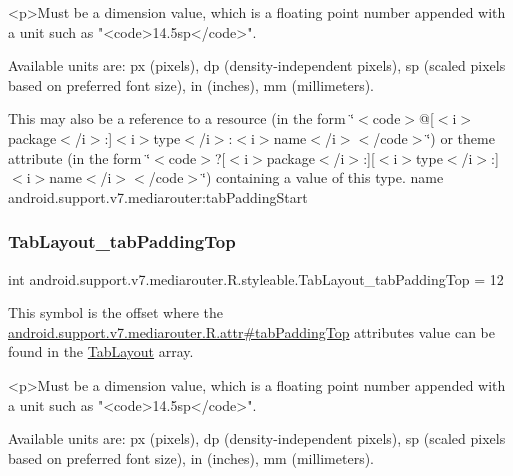 \begin{DoxyVerb}      <p>Must be a dimension value, which is a floating point number appended with a unit such as "<code>14.5sp</code>".
\end{DoxyVerb}
 Available units are\+: px (pixels), dp (density-\/independent pixels), sp (scaled pixels based on preferred font size), in (inches), mm (millimeters). 

This may also be a reference to a resource (in the form \char`\"{}$<$code$>$@\mbox{[}$<$i$>$package$<$/i$>$\+:\mbox{]}$<$i$>$type$<$/i$>$\+:$<$i$>$name$<$/i$>$$<$/code$>$\char`\"{}) or theme attribute (in the form \char`\"{}$<$code$>$?\mbox{[}$<$i$>$package$<$/i$>$\+:\mbox{]}\mbox{[}$<$i$>$type$<$/i$>$\+:\mbox{]}$<$i$>$name$<$/i$>$$<$/code$>$\char`\"{}) containing a value of this type.  name android.\+support.\+v7.\+mediarouter\+:tab\+Padding\+Start \mbox{\label{classandroid_1_1support_1_1v7_1_1mediarouter_1_1R_1_1styleable_a618b0933d1820264a2c2a9ce7e411adc}} 
\subsubsection{\texorpdfstring{Tab\+Layout\+\_\+tab\+Padding\+Top}{TabLayout\_tabPaddingTop}}
{\footnotesize\ttfamily int android.\+support.\+v7.\+mediarouter.\+R.\+styleable.\+Tab\+Layout\+\_\+tab\+Padding\+Top = 12\hspace{0.3cm}{\ttfamily [static]}}

This symbol is the offset where the \hyperlink{classandroid_1_1support_1_1v7_1_1mediarouter_1_1R_1_1attr_aa6eee4f776b2db8b059c557010911559}{android.\+support.\+v7.\+mediarouter.\+R.\+attr\#tab\+Padding\+Top} attribute\textquotesingle{}s value can be found in the \hyperlink{classandroid_1_1support_1_1v7_1_1mediarouter_1_1R_1_1styleable_a94de1350e0a902b4a974d775f2f4f25e}{Tab\+Layout} array.

\begin{DoxyVerb}      <p>Must be a dimension value, which is a floating point number appended with a unit such as "<code>14.5sp</code>".
\end{DoxyVerb}
 Available units are\+: px (pixels), dp (density-\/independent pixels), sp (scaled pixels based on preferred font size), in (inches), mm (millimeters). 

